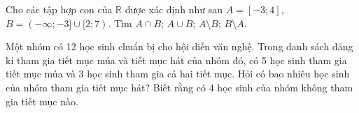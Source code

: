 \begin{bt}%
	Cho các tập hợp con của $\mathbb{R}$ được xác định như sau $A=[-3;4]$, $B=(-\infty;-3] \cup [2;7)$. Tìm $A \cap B$; $A \cup B$; $A \setminus B$; $B\setminus A$.
\end{bt}

\begin{bt}%
	Một nhóm có 12 học sinh chuẩn bị cho hội diễn văn nghệ. Trong danh sách đăng kí tham gia tiết mục múa và tiết mục hát của nhóm đó, có 5 học sinh tham gia tiết mục múa và 3 học sinh tham gia cả hai tiết mục. Hỏi có bao nhiêu học sinh của nhóm tham gia tiết mục hát? Biết rằng có 4 học sinh của nhóm không tham gia tiết mục nào.
\end{bt}

